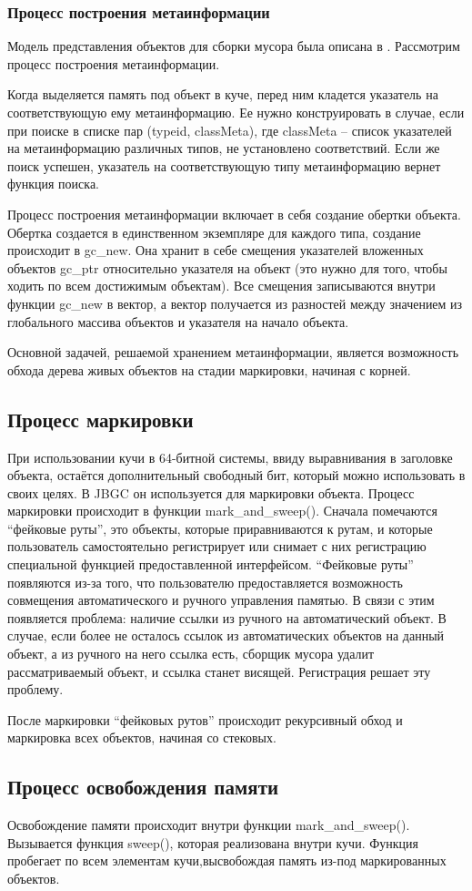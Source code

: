 \subsubsection{Процесс построения метаинформации}

Модель представления объектов для сборки мусора была описана в \cite{meta}. Рассмотрим процесс построения метаинформации.

Когда выделяется память под объект в куче, перед ним кладется указатель на соответствующую ему метаинформацию. 
Ее нужно конструировать в случае, если при поиске в списке пар (typeid, classMeta), где classMeta -- список 
указателей на метаинформацию различных типов, не установлено соответствий. Если же поиск успешен, указатель на 
соответствующую типу метаинформацию вернет функция  поиска.

Процесс построения метаинформации включает в себя создание обертки объекта. Обертка создается в единственном 
экземпляре для каждого типа, создание происходит в gc\_new. Она хранит в себе смещения указателей вложенных 
объектов gc\_ptr относительно указателя на объект (это нужно для того, чтобы ходить по всем достижимым объектам). 
Все смещения записываются внутри функции gc\_new в вектор, а вектор получается из разностей между значением из
глобального массива объектов и указателя на начало объекта. 

Основной задачей, решаемой хранением метаинформации, является возможность обхода дерева живых объектов на стадии
 маркировки, начиная с корней.

\subsection{Процесс маркировки}
При использовании кучи в 64-битной системы, ввиду выравнивания в заголовке объекта, остаётся дополнительный свободный 
бит, который можно использовать в своих целях. В JBGC он используется для маркировки объекта. Процесс маркировки
происходит в функции mark\_and\_sweep(). Сначала помечаются ``фейковые руты'', это объекты, которые приравниваются к 
рутам, и которые пользователь самостоятельно регистрирует или снимает с них регистрацию специальной функцией предоставленной 
интерфейсом.  ``Фейковые руты'' появляются из-за того, что пользователю  предоставляется возможность совмещения автоматического 
и ручного управления памятью. В связи с этим появляется проблема: наличие ссылки из ручного на автоматический объект. 
В случае, если более не осталось ссылок из автоматических объектов на данный объект, а из ручного на него ссылка есть, 
сборщик мусора удалит рассматриваемый объект, и ссылка станет висящей. Регистрация решает эту проблему.

После маркировки ``фейковых рутов'' происходит рекурсивный обход и маркировка всех объектов, начиная со стековых.

\subsection{Процесс освобождения памяти}

Освобождение памяти происходит внутри функции mark\_and\_sweep(). Вызывается функция sweep(), которая реализована 
внутри кучи. Функция пробегает по всем элементам кучи,высвобождая память из-под маркированных объектов.
